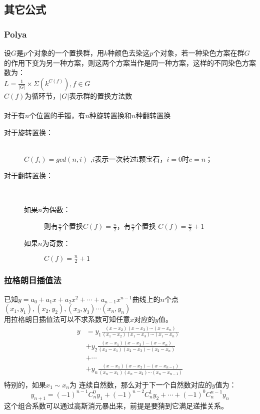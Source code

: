 \subsection{其它公式}
	\subsubsection{Polya}
	设$G$是$p$个对象的一个置换群，用$k$种颜色去染这$p$个对象，若一种染色方案在群$G$的作用下变为另一种方案，则这两个方案当作是同一种方案，这样的不同染色方案数为：\\
	$L=\frac{1}{\left |G  \right |}\times \Sigma(k^{C(f)}), f\in G$\\
	$C(f)$为循环节，$\left |G  \right |$表示群的置换方法数\\
	\\
	对于有$n$个位置的手镯，有$n$种旋转置换和$n$种翻转置换
	\begin{description}
		\item[对于旋转置换：] ~\\
		$C(f_i)=gcd(n,i)$ ,$i$表示一次转过i颗宝石，$i=0$时$c=n$；\\
		\item[对于翻转置换：] ~\\
		\begin{description}
			\item[如果$n$为偶数：] 则有$\frac{n}{2}$个置换$C(f)=\frac{n}{2}$，有$\frac{n}{2}$个置换 $C(f)=\frac{n}{2}+1$\\
			\item[如果$n$为奇数：] $C(f)=\frac{n}{2}+1$\\
		\end{description}
	\end{description}

	\subsubsection{拉格朗日插值法}
	已知$y=a_0+a_1x+a_2x^2+\cdots +a_{n-1}x^{n-1}$曲线上的$n$个点$(x_1,y_1),(x_2,y_2),(x_3,y_3)\cdots (x_n,y_n)$\\
	用拉格朗日插值法可以不求系数可知任意$x$对应的$y$值。\\
	\[ \begin{split}
	y &= y_1\frac{(x-x_2)(x-x_3)\cdots (x-x_n)}{(x_1-x_2)(x_1-x_3)\cdots (x_1-x_n)}\\
	&+ y_2\frac{(x-x_1)(x-x_3)\cdots (x-x_n)}{(x_2-x_1)(x_2-x_3)\cdots (x_2-x_n)}\\
	&+ \cdots \\
	&+ y_n\frac{(x-x_1)(x-x_2)\cdots (x-x_{n-1})}{(x_n-x_1)(x_n-x_2)\cdots (x_n-x_{n-1})}\\
	\end{split}\]
	特别的，如果$x_1\sim x_n$为 连续自然数，那么对于下一个自然数对应的$y$值为：\\
	\[y_{n+1}=(-1)^{n-1}C_n^0y_1+(-1)^{n-2}C_n^1y_2+\cdots +(-1)^0C_n^{n-1}y_n\]
	这个组合系数可以通过高斯消元暴出来，前提是要猜到它满足递推关系。\\
	
